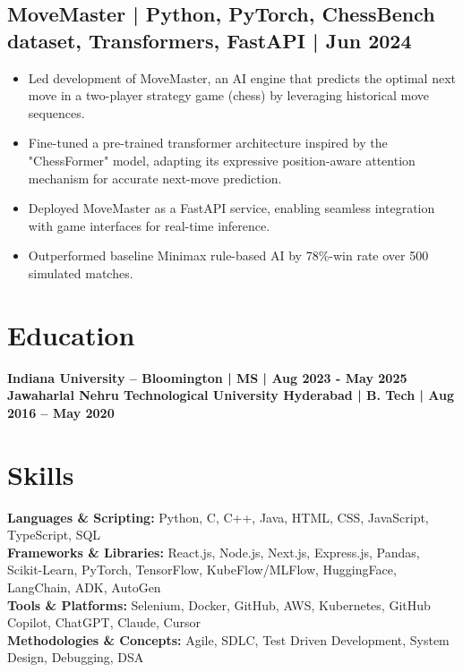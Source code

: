 \documentclass[a4paper,11pt]{article}
\begin{document}
\subsection{MoveMaster | Python, PyTorch, ChessBench dataset, Transformers, FastAPI | Jun 2024}
\begin{itemize}
    \item Led development of MoveMaster, an AI engine that predicts the optimal next move in a two-player strategy game (chess) by leveraging historical move sequences.
    \item Fine-tuned a pre-trained transformer architecture inspired by the "ChessFormer" model, adapting its expressive position-aware attention mechanism for accurate next-move prediction.
    \item Deployed MoveMaster as a FastAPI service, enabling seamless integration with game interfaces for real-time inference.
    \item Outperformed baseline Minimax rule-based AI by 78\%-win rate over 500 simulated matches.
\end{itemize}

\section*{Education}
\textbf{Indiana University – Bloomington | MS | Aug 2023 - May 2025}\\
\textbf{Jawaharlal Nehru Technological University Hyderabad | B. Tech | Aug 2016 – May 2020}

\section*{Skills}
\textbf{Languages \& Scripting:} Python, C, C++, Java, HTML, CSS, JavaScript, TypeScript, SQL \\
\textbf{Frameworks \& Libraries:} React.js, Node.js, Next.js, Express.js, Pandas, Scikit-Learn, PyTorch, TensorFlow, 
KubeFlow/MLFlow, HuggingFace, LangChain, ADK, AutoGen\\
\textbf{Tools \& Platforms:} Selenium, Docker, GitHub, AWS, Kubernetes, GitHub Copilot, ChatGPT, Claude, Cursor \\
\textbf{Methodologies \& Concepts:} Agile, SDLC, Test Driven Development, System Design, Debugging, DSA
\end{document}
